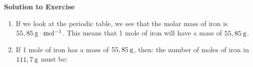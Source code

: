 {\begin{mdframed}[linewidth=4, leftmargin=40, rightmargin=40]
\begin{exercise}
      \vspace{5pt}
      \label{m38717*solfhsst!!!underscore!!!id214}\noindent\textbf{Solution to Exercise } \label{m38717*listfhsst!!!underscore!!!id214}\begin{enumerate}[noitemsep, label=\textbf{Step} \textbf{\arabic*}. ] 
            \leftskip=20pt\rightskip=\leftskip\item  
      \label{m38717*id276821}If we look at the periodic table, we see that the molar mass of iron is \begin{math}55,85\phantom{\rule{2pt}{0ex}}\mathrm{g}\ensuremath{\cdot}\mathrm{mol}{}^{-1}\end{math}. This means that 1 mole of iron will have a mass of \begin{math}55,85\phantom{\rule{2pt}{0ex}}\mathrm{g}\end{math}.\par 
      \item  
      \label{m38717*id276848}If 1 mole of iron has a mass of \begin{math}55,85\phantom{\rule{2pt}{0ex}}\mathrm{g}\end{math}, then: the number of moles of iron in \begin{math}111,7\phantom{\rule{2pt}{0ex}}\mathrm{g}\end{math} must be:\par 
      \label{m38717*id276852}\nopagebreak\noindent{}
    

\end{enumerate}
\end{exercise}
\end{mdframed}}
